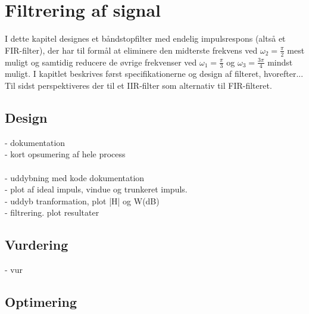 \chapter{Filtrering af signal}
I dette kapitel designes et båndstopfilter med endelig impulsrespons (altså et FIR-filter), der har til formål at eliminere den midterste frekvens ved $\omega_2 = \frac{\pi}{2}$ mest muligt og samtidig reducere de øvrige frekvenser ved $\omega_1 = \frac{\pi}{3}$ og $\omega_3 = \frac{3\pi}{4}$ mindst muligt. I kapitlet beskrives først specifikationerne og design af filteret, hvorefter... Til sidst perspektiveres der til et IIR-filter som alternativ til FIR-filteret.


\section{Design}
- dokumentation\\
- kort opsumering af hele process\\ 
\\
- uddybning med kode dokumentation\\
- plot af ideal impuls, vindue og trunkeret impuls.\\ 
- uddyb tranformation, plot |H| og W(dB)\\
- filtrering. plot resultater \\



\section{Vurdering}
- vur   

\section{Optimering}

